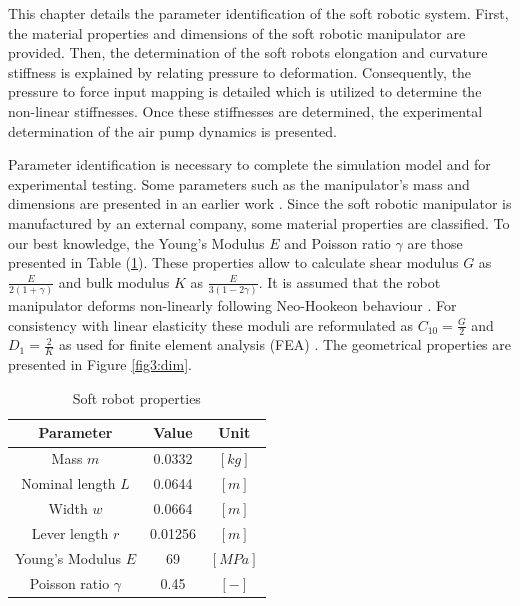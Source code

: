 \label{chap3}

This chapter details the parameter identification of the soft robotic system. First, the material properties and dimensions of the soft robotic manipulator are provided. Then, the determination of the soft robots elongation and curvature stiffness is explained by relating pressure to deformation. Consequently, the pressure to force input mapping is detailed which is utilized to determine the non-linear stiffnesses. Once these stiffnesses are determined, the experimental determination of the air pump dynamics is presented. 


Parameter identification is necessary to complete the simulation model and for experimental testing. Some parameters such as the manipulator's mass and dimensions are presented in an earlier work \cite{berkers}. Since the soft robotic manipulator is manufactured by an external company, some material properties are classified. To our best knowledge, the Young's Modulus $E$ and Poisson ratio $\gamma$ are those presented in Table (\ref{tab4:parameters}). These properties allow to calculate shear modulus $G$ as $\frac{E}{2(1+\gamma)}$ and bulk modulus $K$ as $\frac{E}{3(1-2\gamma)}$. It is assumed that the robot manipulator deforms non-linearly following Neo-Hookeon behaviour \cite{Caasenbrood2020StiffnessModel}. For consistency with linear elasticity these moduli are reformulated as $C_{10} = \frac{G}{2}$ and $D_{1} = \frac{2}{K}$ as used for finite element analysis (FEA) \cite{neohookean}. The geometrical properties are presented in Figure \ref{fig3:dim}.


\begin{table}[H]
    \centering
    \caption{Soft robot properties}
    \begin{tabular}{|c|c|c|} \hline
      \textbf{Parameter}   &  \textbf{Value} & \textbf{Unit} \\ \hline
      Mass $m$             &    0.0332       & $[kg]$ \\ 
      Nominal length $L$ &    0.0644       & $[m]$  \\ 
      Width  $w$     &    0.0664    & $[m]$  \\
      Lever length $r$     &    0.01256      & $[m]$  \\ 
      Young's Modulus $E$  &    69           & $[MPa]$\\ 
      Poisson ratio $\gamma$ &    0.45          & $[-]$ \\ \hline
    \end{tabular}
    \label{tab4:parameters}
\end{table}

